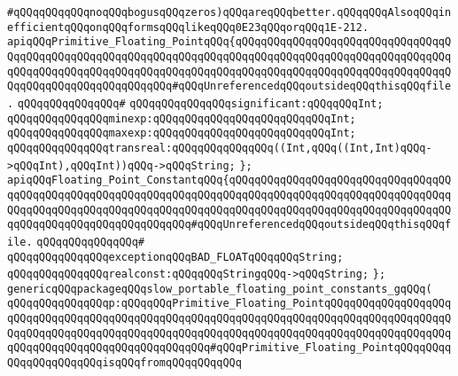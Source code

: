 \verb|#qQQqqQQqqQQqnoqQQqbogusqQQqzeros)qQQqareqQQqbetter.qQQqqQQqAlsoqQQqinefficientqQQqonqQQqformsqQQqlikeqQQq0E23qQQqorqQQq1E-212.|\newline
\newline
\newline
\verb|apiqQQqPrimitive_Floating_PointqQQq{qQQqqQQqqQQqqQQqqQQqqQQqqQQqqQQqqQQqqQQqqQQqqQQqqQQqqQQqqQQqqQQqqQQqqQQqqQQqqQQqqQQqqQQqqQQqqQQqqQQqqQQqqQQqqQQqqQQqqQQqqQQqqQQqqQQqqQQqqQQqqQQqqQQqqQQqqQQqqQQqqQQqqQQqqQQqqQQqqQQqqQQqqQQqqQQqqQQqqQQq#qQQqUnreferencedqQQqoutsideqQQqthisqQQqfile.|\newline
\verb|qQQqqQQqqQQqqQQq#|\newline
\verb|qQQqqQQqqQQqqQQqsignificant:qQQqqQQqInt;|\newline
\verb|qQQqqQQqqQQqqQQqminexp:qQQqqQQqqQQqqQQqqQQqqQQqqQQqInt;|\newline
\verb|qQQqqQQqqQQqqQQqmaxexp:qQQqqQQqqQQqqQQqqQQqqQQqqQQqInt;|\newline
\verb|qQQqqQQqqQQqqQQqtransreal:qQQqqQQqqQQqqQQq((Int,qQQq((Int,Int)qQQq->qQQqInt),qQQqInt))qQQq->qQQqString;|\newline
\verb|};|\newline
\newline
\verb|apiqQQqFloating_Point_ConstantqQQq{qQQqqQQqqQQqqQQqqQQqqQQqqQQqqQQqqQQqqQQqqQQqqQQqqQQqqQQqqQQqqQQqqQQqqQQqqQQqqQQqqQQqqQQqqQQqqQQqqQQqqQQqqQQqqQQqqQQqqQQqqQQqqQQqqQQqqQQqqQQqqQQqqQQqqQQqqQQqqQQqqQQqqQQqqQQqqQQqqQQqqQQqqQQqqQQqqQQqqQQqqQQq#qQQqUnreferencedqQQqoutsideqQQqthisqQQqfile.|\newline
\verb|qQQqqQQqqQQqqQQq#|\newline
\verb|qQQqqQQqqQQqqQQqexceptionqQQqBAD_FLOATqQQqqQQqString;|\newline
\newline
\verb|qQQqqQQqqQQqqQQqrealconst:qQQqqQQqStringqQQq->qQQqString;|\newline
\verb|};|\newline
\newline
\verb|genericqQQqpackageqQQqslow_portable_floating_point_constants_gqQQq(|\newline
\newline
\verb|qQQqqQQqqQQqqQQqp:qQQqqQQqPrimitive_Floating_PointqQQqqQQqqQQqqQQqqQQqqQQqqQQqqQQqqQQqqQQqqQQqqQQqqQQqqQQqqQQqqQQqqQQqqQQqqQQqqQQqqQQqqQQqqQQqqQQqqQQqqQQqqQQqqQQqqQQqqQQqqQQqqQQqqQQqqQQqqQQqqQQqqQQqqQQqqQQqqQQqqQQqqQQqqQQqqQQqqQQqqQQqqQQqqQQq#qQQqPrimitive_Floating_PointqQQqqQQqqQQqqQQqqQQqqQQqisqQQqfromqQQqqQQqqQQq|\newline
